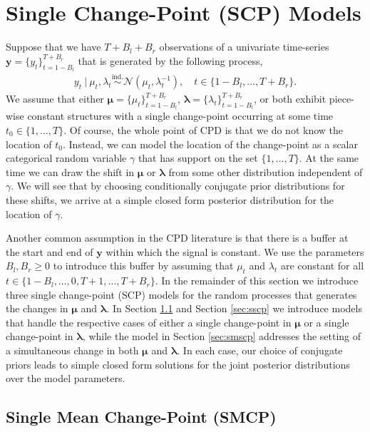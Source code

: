 \section{Single Change-Point (SCP) Models}
\label{sec:scp}

Suppose that we have $T+B_l+B_r$ observations of a univariate time-series $\mathbf{y} = \{y_t\}_{t=1-B_l}^{T+B_r}$ that is generated by the following process,
\begin{align}\label{eq:dgp}
    y_t \:|\: \mu_t, \lambda_t \overset{\text{ind.}}{\sim} \mathcal{N}\left(\mu_t, \lambda^{-1}_t\right), \quad t \in \{1-B_l,\ldots,T+B_r\}.
\end{align}
We assume that either $\pmb{\mu} = \{\mu_t\}_{t=1-B_l}^{T+B_r}$, $\pmb{\lambda} = \{\lambda_t\}^{T+B_r}_{t=1-B_l}$, or both exhibit piece-wise constant structures with a single change-point occurring at some time $t_0 \in \{1,\ldots,T\}$. Of course, the whole point of CPD is that we do not know the location of $t_0$. Instead, we can model the location of the change-point as a scalar categorical random variable $\gamma$ that has support on the set $\{1,\ldots,T\}$. At the same time we can draw the shift in $\pmb{\mu}$ or $\pmb{\lambda}$ from some other distribution independent of $\gamma$. We will see that by choosing conditionally conjugate prior distributions for these shifts, we arrive at a simple closed form posterior distribution for the location of $\gamma$. 

Another common assumption in the CPD literature is that there is a buffer at the start and end of $\mathbf{y}$ within which the signal is constant. We use the parameters $B_l,B_r \geq 0$ to introduce this buffer by assuming that $\mu_t$ and $\lambda_t$ are constant for all $t\in\{1-B_l,\ldots,0,T+1, \ldots, T+B_r\}$. In the remainder of this section we introduce three single change-point (SCP) models for the random processes that generates the changes in $\pmb{\mu}$ and $\pmb{\lambda}$. In Section \ref{sec:smcp} and Section \ref{sec:sscp} we introduce models that handle the respective cases of either a single change-point in $\pmb{\mu}$ or a single change-point in $\pmb{\lambda}$, while the model in Section \ref{sec:smscp} addresses the setting of a simultaneous change in both $\pmb{\mu}$ and $\pmb{\lambda}$. In each case, our choice of conjugate priors leads to simple closed form solutions for the joint posterior distributions over the model parameters.

\subsection{Single Mean Change-Point (SMCP)}
\label{sec:smcp}

